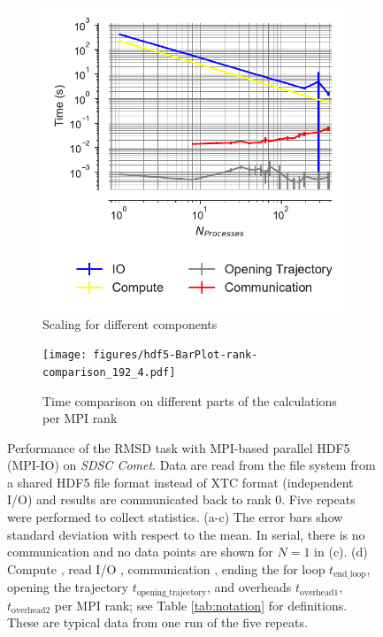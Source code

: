 \begin{figure}[!htb]
  \begin{subfigure}{.49\textwidth}
    \centering
    \includegraphics[width=\linewidth]{figures/hdf5-time_comp_IO_comparison.pdf}
    \captionsetup{format=hang}
    \caption{Scaling for different components}
    \label{fig:ScalingComputeIO-hdf5}
  \end{subfigure}
  \hfill
  \begin{subfigure} {.5\textwidth}
    \texttt{[image: figures/hdf5-BarPlot-rank-comparison\_192\_4.pdf]}
    \captionsetup{format=hang}
    \caption{Time comparison on different parts of the calculations per MPI rank}
    \label{fig:MPIranks-hdf5}
  \end{subfigure}
  \caption{Performance of the RMSD task with MPI-based parallel HDF5 (MPI-IO) on \emph{SDSC Comet}.
    Data are read from the file system from a shared HDF5 file format instead of XTC format (independent I/O) and results are communicated back to rank 0. 
    Five repeats were performed to collect statistics.
    (a-c) The error bars show standard deviation with respect to the mean.
    In serial, there is no communication and no data points are shown for $N=1$ in (c).
    (d) Compute \tcomp, read I/O \tIO, communication \tcomm, ending the for loop $t_{\text{end\_loop}}$,
    opening the trajectory $t_{\text{opening\_trajectory}}$, and overheads $t_{\text{overhead1}}$, $t_{\text{overhead2}}$ per MPI rank; see Table \ref{tab:notation} for definitions.
    These are typical data from one run of the five repeats.
  }
  \label{fig:MPIwithIO-hdf5}
\end{figure}

